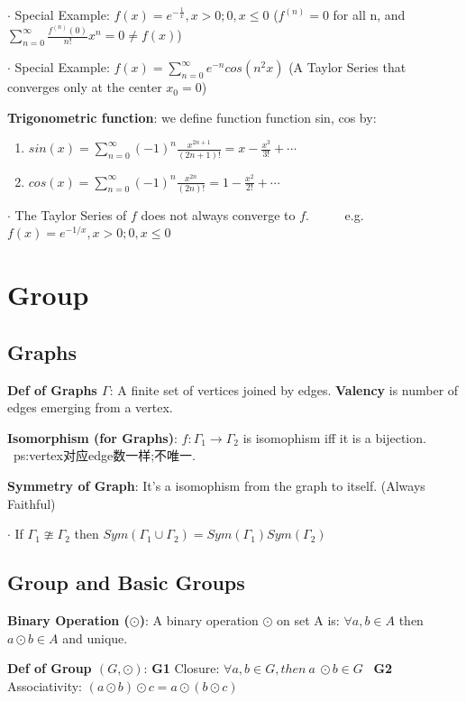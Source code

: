 \documentclass[11pt]{article}
\begin{document}
$\cdot$ Special Example: $f(x)=e^{-\frac{1}{x}},x>0;0,x\leq 0$ {\small ($f^{(n)}=0$ for all n, and $\sum\limits_{n=0}^{\infty}\frac{f^{(n)}(0)}{n!}x^n=0\ne f(x)$)}

$\cdot$ Special Example: $f(x)=\sum_{n=0}^{\infty}e^{-n}cos(n^2x)$ {\small(A Taylor Series that converges only at the center $x_0=0$)}

\textbf{Trigonometric function}: we define function function sin, cos by:
\begin{enumerate}[itemsep=-2pt, topsep=-2pt]
    \item $sin(x)=\sum\limits_{n=0}^{\infty}(-1)^n\frac{x^{2n+1}}{(2n+1)!}=x-\frac{x^3}{3!}+\cdots$
    \item $cos(x)=\sum\limits_{n=0}^{\infty}(-1)^n\frac{x^{2n}}{(2n)!}=1-\frac{x^2}{2!}+\cdots$
\end{enumerate}

$\cdot$ The Taylor Series of $f$ does not always converge to $f$. \ \ \ \ \ e.g. $f(x)=e^{-1/x},x>0;0,x\leq0$

\section{Group} %
\subsection{Graphs}

\textbf{Def of Graphs $\Gamma$}: A finite set of vertices joined by edges. \textbf{Valency} is number of edges emerging from a vertex.

\textbf{Isomorphism (for Graphs)}: $f:\Gamma_1\to\Gamma_2$ is isomophism iff it is a bijection. \ ps:vertex对应edge数一样;不唯一.

\textbf{Symmetry of Graph}: It's a isomophism from the graph to itself. (Always Faithful)

$\cdot$ If $\Gamma_1 \ncong \Gamma_2$ then $Sym(\Gamma_1\cup\Gamma_2)=Sym(\Gamma_1)Sym(\Gamma_2)$

\subsection{Group and Basic Groups}

\textbf{Binary Operation ($\odot$)}: A binary operation $\odot$ on set A is: $\forall a,b\in A$ then $a\odot b \in A$ and unique.

\textbf{Def of Group $(G,\odot)$}: \textbf{G1} Closure: $\forall a,b\in G,then \ a \ \odot b\in G$ \ \textbf{G2} Associativity: $(a\odot b)\odot c=a\odot (b\odot c)$
\end{document}
